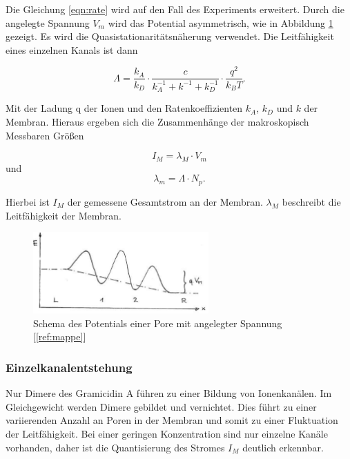 \documentclass[a4paper,ngerman]{scrartcl}
\begin{document}
Die Gleichung \ref{eqn:rate} wird auf den Fall des Experiments erweitert. Durch die angelegte Spannung $V_{m}$ wird das Potential asymmetrisch, wie in Abbildung \ref{fig:potential-asym} gezeigt.  Es wird die Quasistationaritätsnäherung verwendet. Die Leitfähigkeit eines einzelnen Kanals ist dann

\begin{equation}
\Lambda = \frac{k_A}{k_D} \cdot \frac{c}{k_A^{-1}+k^{-1}+k_D^{-1}} \cdot  \frac{q^2}{k_B T} .
\end{equation}

Mit der Ladung q der Ionen und den Ratenkoeffizienten $k_A$, $k_D$ und $k$ der Membran.
Hieraus ergeben sich die Zusammenhänge der makroskopisch Messbaren Größen

\begin{equation}
I_M = \lambda_M \cdot V_m
\end{equation}
und
\begin{equation}
\lambda_m = \Lambda \cdot N_p.
\end{equation}

Hierbei ist $I_M$ der gemessene Gesamtstrom an der Membran. $\lambda_M$ beschreibt die Leitfähigkeit der Membran.


\begin{figure}
\includegraphics[width=0.6\textwidth]{abbildungen/potential-asym.png}
\caption{Schema des Potentials einer Pore mit angelegter Spannung [\ref{ref:mappe}]}
\label{fig:potential-asym}
\end{figure}



\subsubsection{Einzelkanalentstehung}

Nur Dimere des Gramicidin A führen zu einer Bildung von Ionenkanälen. Im Gleichgewicht werden Dimere gebildet und vernichtet. Dies führt zu einer variierenden Anzahl an Poren in der Membran und somit zu einer Fluktuation der Leitfähigkeit. Bei einer geringen Konzentration sind nur einzelne Kanäle vorhanden, daher ist die Quantisierung des Stromes $I_M$ deutlich erkennbar.
\end{document}
